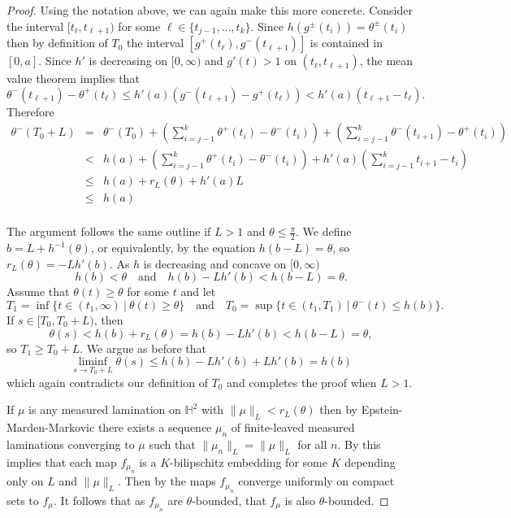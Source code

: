 \documentclass{amsart}
\theoremstyle{plain}
\theoremstyle{definition}
\theoremstyle{remark}
\newcommand{\Hp}{{\mathbb H}^2}
\newcommand{\<}{\left <}
\renewcommand{\>}{\right >}
\begin{document}
\begin{proof}
Using the notation above, we can again make this more concrete.
Consider the interval $[t_\ell, t_{\ell+1})$ for some $\ell \in \{t_{j-1},\ldots,t_{k}\}$. Since  $h(g^\pm(t_i)) = \theta^\pm(t_i)$ then by definition of $T_0$ the interval $[g^+(t_\ell),g^-(t_{\ell+1})]$ is contained in  $[0,a]$. Since $h'$ is decreasing on $[0,\infty)$ and $g'(t) > 1$ on $(t_{\ell},t_{\ell+1})$, the mean value theorem 
implies that
$$\theta^-(t_{\ell+1})-\theta^+(t_\ell) \leq h'(a)(g^-(t_{\ell+1})-g^+(t_\ell)) < h'(a)(t_{\ell+1}-t_\ell).$$
Therefore
\begin{eqnarray*}
\theta^-(T_0+L)&=&\theta^{-}(T_0)+ \left(\sum_{i=j-1}^k \theta^+(t_i)-\theta^-(t_i)\right)+\left(\sum_{i=j-1}^{k}  \theta^-(t_{i+1})-\theta^+(t_i)\right)\\
& <& h(a)+\left(\sum_{i=j-1}^k \theta^+(t_i)-\theta^-(t_i)\right) + h'(a)\left(\sum_{i=j-1}^{k}  t_{i+1}-t_i\right)\\
&\le&  h(a)+r_L(\theta)+h'(a)L \\
&\le &   h(a)\\
\end{eqnarray*}

The argument follows the same outline if $L>1$ and $\theta\le\frac{\pi}{2}$. 
We define $b = L+h^{-1}(\theta)$, or equivalently, by the equation $h(b-L) = \theta$, so $r_L(\theta)=-Lh'(b)$. As $h$ is decreasing  and concave on $[0,\infty)$  
$$h(b)<\theta\quad\text{and}\quad h(b)-Lh'(b)<h(b-L)=\theta.$$ 
Assume that $\theta(t) \geq \theta$ for some $t$ and let
$$T_1 = \inf\{ t \in (t_1,\infty) \ | \ \theta(t) \geq \theta\}\quad\text{and}\quad T_0 = \sup\{ t \in (t_1,T_1) \ | \ \theta^-(t) \leq h(b)\}.$$
If $s\in[T_0,T_0+L)$, then 
$$\theta(s) < h(b)+r_L(\theta) = h(b) -Lh'(b) <h(b-L)= \theta,$$
so $T_1\ge T_0+L$. We argue as before that
$$\liminf_{s\rightarrow T_0+L} \theta(s) \le h(b) -Lh'(b)+Lh'(b) = h(b)$$
which again contradicts our definition of $T_0$ and completes the proof when $L>1$.


If $\mu$ is any measured lamination  on $\Hp$ with $\|\mu\|_L < r_L(\theta)$ then
by Epstein-Marden-Markovic \cite[Lemma 4.6]{EMM2} there exists a sequence $\mu_n$  of finite-leaved measured laminations converging to $\mu$ 
such that $\|\mu_n\|_L = \|\mu\|_L$ for all $n$. By \cite[Corollary 4.8]{BCY}  this implies that each map $f_{\mu_n}$ is a $K$-bilipschitz embedding  for 
some $K$ depending only on $L$ and $\|\mu\|_L$. Then by \cite[Theorem III.3.11.9]{EM} the maps $f_{\mu_n}$ converge uniformly on compact sets 
to $f_\mu$. It follows that as $f_{\mu_n}$ are $\theta$-bounded, that $f_\mu$ is also $\theta$-bounded.  
\end{proof}
\end{document}
